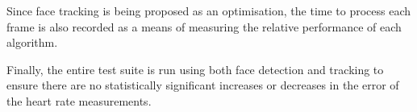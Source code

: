 Since face tracking is being proposed as an optimisation, the time to process each frame is also recorded as a means of measuring the relative performance of each algorithm.
\par
Finally, the entire test suite is run using both face detection and tracking to ensure there are no statistically significant increases or decreases in the error of the heart rate measurements.


